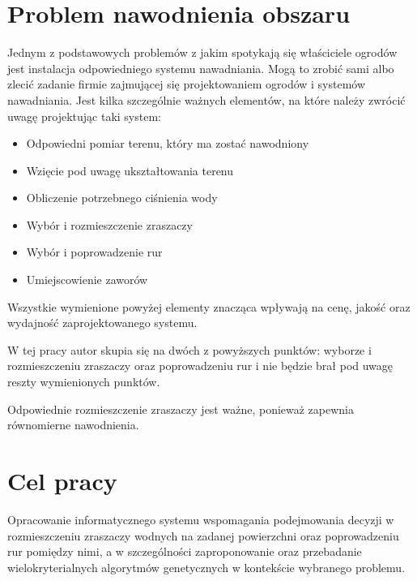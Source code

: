 \documentclass[twoside]{iisthesis}
\begin{document}
\section{Problem nawodnienia obszaru}
Jednym z podstawowych problemów z jakim spotykają się właściciele ogrodów jest instalacja odpowiedniego systemu nawadniania. Mogą to zrobić sami albo zlecić zadanie firmie zajmującej się projektowaniem ogrodów i systemów nawadniania.
Jest kilka szczególnie ważnych elementów, na które należy zwrócić uwagę projektując taki system:\\
\begin{itemize}
	\item Odpowiedni pomiar terenu, który ma zostać nawodniony
	\item Wzięcie pod uwagę ukształtowania terenu
	\item Obliczenie potrzebnego ciśnienia wody
	\item Wybór i rozmieszczenie zraszaczy
	\item Wybór i poprowadzenie rur
	\item Umiejscowienie zaworów\\
\end{itemize}
Wszystkie wymienione powyżej elementy znacząca wpływają na cenę, jakość oraz wydajność zaprojektowanego systemu.

W tej pracy autor skupia się na dwóch z powyższych punktów: wyborze i rozmieszczeniu zraszaczy oraz poprowadzeniu rur i nie będzie brał pod uwagę reszty wymienionych punktów.

Odpowiednie rozmieszczenie zraszaczy jest ważne, ponieważ zapewnia równomierne nawodnienia.

\section{Cel pracy}
Opracowanie informatycznego systemu wspomagania podejmowania decyzji w rozmieszczeniu zraszaczy wodnych na zadanej powierzchni oraz poprowadzeniu rur pomiędzy nimi, a w szczególności zaproponowanie oraz przebadanie wielokryterialnych algorytmów genetycznych w kontekście wybranego problemu.
\end{document}
